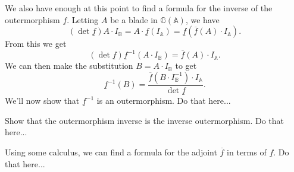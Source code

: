 \documentclass[12pt]{article}
\newcommand{\G}{\mathbb{G}}
\newcommand{\A}{\mathbb{A}}
\newcommand{\B}{\mathbb{B}}
\newcommand{\ob}{\overline}
\newcommand{\ub}{\underline}
\begin{document}
We also have enough at this point to find a formula for the inverse of
the outermorphism $\ub{f}$.  Letting $A$ be a blade in $\G(\A)$,
we have
\begin{equation*}
(\det\ub{f})A\cdot I_{\B} = A\cdot\ub{f}(I_{\A}) = \ub{f}(\ob{f}(A)\cdot I_{\A}).
\end{equation*}
From this we get
\begin{equation*}
(\det\ub{f})\ub{f}^{-1}(A\cdot I_{\B}) = \ob{f}(A)\cdot I_{\A}.
\end{equation*}
We can then make the substitution $B=A\cdot I_{\B}$ to get
\begin{equation}\label{equ_inv_of_outermorphism}
\ub{f}^{-1}(B) = \frac{\ob{f}(B\cdot I^{-1}_{\B})\cdot I_{\A}}{\det\ub{f}}.
\end{equation}
We'll now show that $\ub{f}^{-1}$ is an outermorphism.  Do that here...

Show that the outermorphism inverse is the inverse outermorphism.  Do that here...

Using some calculus, we can find a formula for the adjoint $\ob{f}$ in terms of $\ub{f}$.  Do that here...



\end{document}
